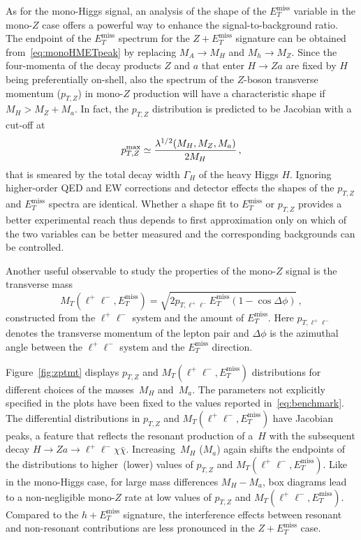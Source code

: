 \documentclass[review]{elsarticle}
\newcommand{\MET}{\ensuremath{E_T^\mathrm{miss}}\xspace}
\newcommand{\ma}{\ensuremath{M_{a}}\xspace}
\newcommand{\mH}{\ensuremath{M_{H}}\xspace}
\begin{document}
As for the mono-Higgs signal, an analysis of the shape of the $\MET$ variable in the mono-$Z$ case offers a powerful way to enhance the signal-to-background ratio. The endpoint of the $\MET$ spectrum for the $Z+\MET$ signature can be obtained from~\eqref{eq:monoHMETpeak} by  replacing $M_A \to M_H$ and $M_h \to M_Z$.  Since the four-momenta of the decay products $Z$ and $a$ that enter $H \to Za$ are fixed by $H$ being preferentially on-shell, also the spectrum of the $Z$-boson transverse momentum ($p_{T,Z}$) in mono-$Z$ production will have a characteristic shape if $M_H > M_Z + M_a$.   In fact,  the $p_{T,Z}$ distribution is predicted  to be Jacobian with a cut-off at~\cite{No:2015xqa,Bauer:2017ota}
\begin{equation} \label{eq:monoZpTpeak}
p_{T,Z}^{ {\rm max} } \simeq \frac{\lambda^{1/2}(M_H, M_Z, M_a)}{2 M_H}\,,
\end{equation}
that is smeared by the total decay width $\Gamma_H$ of the heavy Higgs $H$. Ignoring higher-order QED and EW corrections and detector effects the shapes of the $p_{T,Z}$ and $\MET$ spectra are identical. Whether a shape fit to $\MET$ or $p_{T,Z}$ provides a better experimental reach thus depends to first approximation only on which of the two variables can be better measured and the corresponding backgrounds can be controlled.

Another useful observable to study the properties of the mono-$Z$ signal is the transverse mass 
\begin{equation} \label{eq:transversemass}
M_T (\ell^+ \ell^-,\MET) = \sqrt{2 p_{T, \ell^+ \ell^-}  \MET  \left ( 1- \cos \Delta \phi \right )} \,,
\end{equation}
constructed from the $\ell^+ \ell^-$ system and the amount of $\MET$. Here $p_{T, \ell^+ \ell^-}$ denotes the transverse momentum of the lepton pair and $\Delta \phi$ is the azimuthal angle between the $\ell^+ \ell^-$ system and the $\MET$ direction.

Figure~\ref{fig:zptmt} displays  $p_{T,Z}$ and $M_T(\ell^+ \ell^-, \MET)$ distributions for different choices of the masses~$M_H$ and~$M_a$. The parameters not explicitly specified in the plots have been  fixed to the values reported in~\eqref{eq:benchmark}. The differential distributions in $p_{T,Z}$ and $M_T(\ell^+ \ell^-, \MET)$ have Jacobian peaks, a feature that  reflects the resonant production of a~$H$ with the subsequent decay $H \to Z a \to \ell^+ \ell^- \chi \bar \chi$.  Increasing~$\mH$ ($\ma$) again shifts the endpoints of the distributions to higher~(lower) values of $p_{T,Z}$ and $M_T(\ell^+ \ell^-, \MET)$. Like in the mono-Higgs case, for large mass differences $M_H - M_a$, box diagrams lead to a non-negligible mono-$Z$ rate at low values of $p_{T,Z}$ and $M_T(\ell^+ \ell^-, \MET)$. Compared to the $h + \MET$ signature, the interference effects between resonant and non-resonant contributions  are less pronounced  in  the $Z + \MET$  case. 
\end{document}
